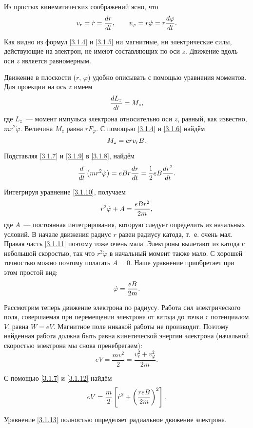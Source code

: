 Из простых кинематических соображений ясно, что
\begin{equation}
	v_r=\dot{r}=\frac{dr}{dt},\qquad v_{\varphi}=r\dot{\varphi}=r\frac{d\varphi}{dt}.
	\eqmark{3.1.7}
\end{equation}

Как видно из формул \eqref{3.1.4} и \eqref{3.1.5} ни магнитные, ни электрические силы, действующие на электрон, не имеют составляющих по оси $z$. Движение вдоль оси $z$ является равномерным.

Движение в плоскости ($r$, $\varphi$) удобно описывать с помощью уравнения моментов. Для проекции на ось $z$ имеем
\begin{equation}
	\frac{dL_{z}}{dt}=M_z,
	\eqmark{3.1.8}
\end{equation}
где $L_{z}$~--- момент импульса электрона относительно оси $z$, равный, как известно, $mr^2\dot{\varphi}$. Величина $M_z$ равна $rF_{\varphi}$. С помощью \eqref{3.1.4} и \eqref{3.1.6} найдём
\begin{equation}
	M_z=erv_rB.
	\eqmark{3.1.9}
\end{equation}

Подставляя \eqref{3.1.7} и \eqref{3.1.9} в \eqref{3.1.8}, найдём
\begin{equation}
	\frac{d}{dt}\left(mr^2\dot{\varphi}\right)=eBr\frac{dr}{dt}=\frac12eB\frac{dr^2}{dt}.
	\eqmark{3.1.10}
\end{equation}

Интегрируя уравнение \eqref{3.1.10}, получаем
\begin{equation}
	r^2\dot{\varphi}+A=\frac{eBr^2}{2m},
	\eqmark{3.1.11}
\end{equation}
где $A$~--- постоянная интегрирования, которую следует определить из начальных условий. В начале движения радиус $r$ равен радиусу катода, т.~е. очень мал. Правая часть \eqref{3.1.11} поэтому тоже очень мала. Электроны вылетают из катода с небольшой скоростью, так что $r^{2}\dot{\varphi}$ в начальный момент также мало. С хорошей точностью можно поэтому полагать $A=0$. Наше уравнение приобретает при этом простой вид:
\begin{equation}
	\dot{\varphi}=\frac{eB}{2m}.
	\eqmark{3.1.12}
\end{equation}

Рассмотрим теперь движение электрона по радиусу. Работа сил электрического поля, совершаемая при перемещении электрона от катода до точки с потенциалом $V$, равна $W=eV$. Магнитное поле никакой работы не производит. Поэтому найденная работа должна быть равна кинетической энергии электрона (начальной скоростью электрона мы снова пренебрегаем):
\begin{equation*}
	eV=\frac{mv^2}{2}=\frac{v_r^2+v_\varphi^2}{2m}.
\end{equation*}

С помощью \eqref{3.1.7} и \eqref{3.1.12} найдём
\begin{equation}
	eV=\frac{m}{2}\left[\dot{r}^2+\left(\frac{reB}{2m}\right)^2\right].
	\eqmark{3.1.13}
\end{equation}

Уравнение \eqref{3.1.13} полностью определяет радиальное движение электрона.



